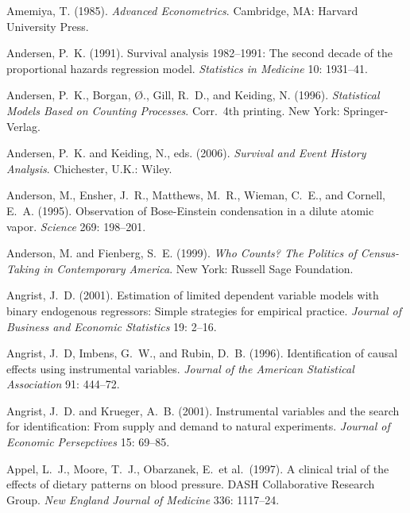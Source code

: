 \smallskip\noindent
Amemiya, T. (1985).
{\it Advanced Econometrics\/}.
Cambridge, MA: Harvard University Press.

\smallskip\noindent
Andersen, P.~K. (1991).
Survival analysis 1982--1991: The second decade of the
proportional hazards regression model.
{\it Statistics in Medicine\/} 10: 1931--41.

\smallskip\noindent
Andersen, P.~K., Borgan, \O., Gill, R.~D., and Keiding, N. (1996).
{\it Statistical Models Based on Counting Processes\/}.
Corr.~4th printing. New York: Springer-Verlag.

\headline{\ifodd\pageno\rightheadline \else\leftheadline\fi}
\def\rightheadline{\sc References \hfill \folio}
\def\leftheadline{\sc\folio \hfill David A.~Freedman}
\baselineskip


\smallskip\noindent
Andersen, P.~K. and Keiding, N., eds. (2006).
{\it Survival and Event History Analysis\/}.
Chichester, U.K.: Wiley.



\smallskip\noindent
Anderson, M., Ensher, J.~R., Matthews, M.~R., Wieman, C.~E., and Cornell, E.~A. (1995).
Observation of Bose-Einstein condensation in a dilute atomic vapor.
{\it Science\/} {269}: 198--201.

\smallskip\noindent
Anderson, M. and Fienberg, S.~E. (1999).
{\it Who Counts? The Politics of Census-Taking in Contemporary America\/}.
New York: Russell Sage Foundation.

\smallskip\noindent
Angrist, J.~D. (2001).
Estimation of limited dependent variable models with binary
endogenous regressors: Simple strategies for empirical practice.
{\it Journal of Business and Economic Statistics\/} 19: 2--16.

\smallskip\noindent
Angrist, J.~D, Imbens, G.~W., and Rubin, D.~B. (1996).
Identification of causal effects using instrumental variables.
{\it Journal of the American Statistical Association\/} 91: 444--72.

\smallskip\noindent
Angrist, J.~D. and Krueger, A.~B. (2001).
Instrumental variables and the search for identification:
From supply and demand to natural experiments.
{\it Journal of Economic Persepctives\/} 15: 69--85.

\smallskip\noindent
Appel, L.~J., Moore, T.~J., Obarzanek, E.~et al.~(1997).
A clinical trial of the effects of dietary patterns on blood pressure.
DASH Collaborative Research Group.
{\it New England Journal of Medicine\/} 336: 1117--24.

